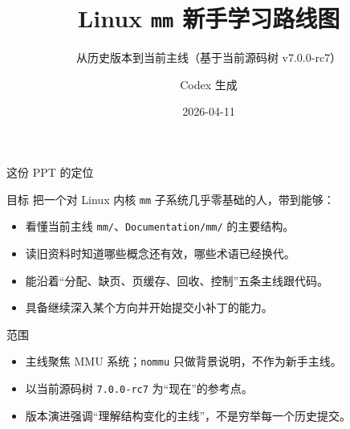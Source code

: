 \documentclass[UTF8,aspectratio=169]{ctexbeamer}
\title{Linux \texttt{mm} 新手学习路线图}
\subtitle{从历史版本到当前主线（基于当前源码树 v7.0.0-rc7）}
\author{Codex 生成}
\date{2026-04-11}
\begin{document}
\begin{frame}
  \titlepage
\end{frame}

\begin{frame}[t]{这份 PPT 的定位}
\small
\begin{block}{目标}
把一个对 Linux 内核 \texttt{mm} 子系统几乎零基础的人，带到能够：
\begin{itemize}
  \item 看懂当前主线 \texttt{mm/}、\texttt{Documentation/mm/} 的主要结构。
  \item 读旧资料时知道哪些概念还有效，哪些术语已经换代。
  \item 能沿着“分配、缺页、页缓存、回收、控制”五条主线跟代码。
  \item 具备继续深入某个方向并开始提交小补丁的能力。
\end{itemize}
\end{block}

\begin{block}{范围}
\begin{itemize}
  \item 主线聚焦 MMU 系统；\texttt{nommu} 只做背景说明，不作为新手主线。
  \item 以当前源码树 \texttt{7.0.0-rc7} 为“现在”的参考点。
  \item 版本演进强调“理解结构变化的主线”，不是穷举每一个历史提交。
\end{itemize}
\end{block}
\end{frame}
\end{document}
